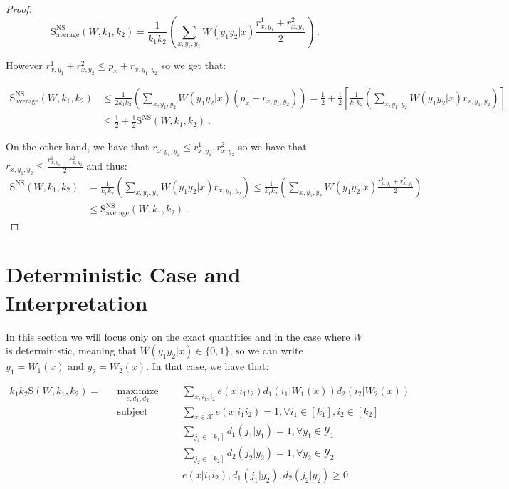 \documentclass[11pt]{article}
\theoremstyle{definition}
\theoremstyle{remark}
\DeclareMathOperator{\maxi}{\text{maximize}}
\DeclareMathOperator{\st}{\text{subject to}}
\begin{document}
\begin{proof}
  \[ \mathrm{S}_{\text{average}}^{\mathrm{NS}}(W,k_1,k_2) = \frac{1}{k_1k_2}\left(\sum_{x,y_1,y_2} W(y_1y_2|x)\frac{r^1_{x,y_1} + r^2_{x,y_2}}{2}\right) \ . \]

  However $r^1_{x,y_1} + r^2_{x,y_2} \leq p_x + r_{x,y_1,y_2}$ so we get that:

  \begin{equation}
    \begin{aligned}
      \mathrm{S}_{\text{average}}^{\mathrm{NS}}(W,k_1,k_2) &\leq \frac{1}{2k_1k_2}\left(\sum_{x,y_1,y_2} W(y_1y_2|x)\left( p_x + r_{x,y_1,y_2}\right)\right)  = \frac{1}{2} + \frac{1}{2}\left[\frac{1}{k_1k_2}\left(\sum_{x,y_1,y_2} W(y_1y_2|x)r_{x,y_1,y_2}\right)\right]\\
      &\leq \frac{1}{2} + \frac{1}{2}\mathrm{S}^{\mathrm{NS}}(W,k_1,k_2) \ .
    \end{aligned}
  \end{equation}

  On the other hand, we have that $r_{x,y_1,y_2} \leq r^1_{x,y_1},r^2_{x,y_2}$ so we have that $r_{x,y_1,y_2} \leq \frac{r^1_{x,y_1}+r^2_{x,y_2}}{2}$ and thus:
  \begin{equation}
    \begin{aligned}
      \mathrm{S}^{\mathrm{NS}}(W,k_1,k_2) &= \frac{1}{k_1k_2}\left(\sum_{x,y_1,y_2} W(y_1y_2|x)r_{x,y_1,y_2}\right) \leq \frac{1}{k_1k_2}\left(\sum_{x,y_1,y_2} W(y_1y_2|x)\frac{r^1_{x,y_1}+r^2_{x,y_2}}{2}\right)\\
      &\leq \mathrm{S}_{\text{average}}^{\mathrm{NS}}(W,k_1,k_2) \ .
    \end{aligned}
  \end{equation}
\end{proof}

\section{Deterministic Case and Interpretation}
In this section we will focus only on the exact quantities and in the case where $W$ is deterministic, meaning that $W(y_1y_2|x) \in \{0,1\}$, so we can write $y_1 = W_1(x)$ and $y_2 = W_2(x)$. In that case, we have that:

\begin{equation}
  \begin{aligned}
    k_1k_2\mathrm{S}(W,k_1,k_2) = &&\underset{e,d_1,d_2}{\maxi} &&& \sum_{x,i_1,i_2}e(x|i_1i_2)d_1(i_1|W_1(x))d_2(i_2|W_2(x))\\
    &&\st &&& \sum_{x \in \mathcal{X}} e(x|i_1i_2) = 1, \forall i_1 \in [k_1], i_2 \in [k_2]\\
    &&&&& \sum_{j_1 \in [k_1]} d_1(j_1|y_1) = 1, \forall y_1 \in \mathcal{Y}_1\\
    &&&&& \sum_{j_2 \in [k_2]} d_2(j_2|y_2) = 1, \forall y_2 \in \mathcal{Y}_2\\
    &&&&& e(x|i_1i_2), d_1(j_1|y_2), d_2(j_2|y_2) \geq 0
  \end{aligned}
\end{equation}
\end{document}
